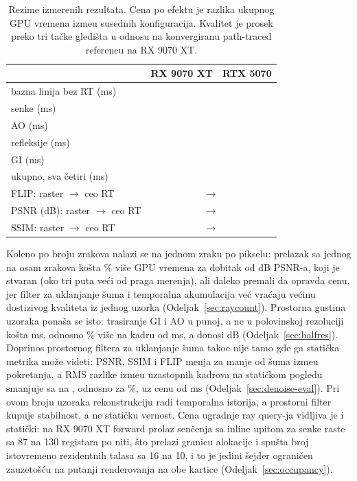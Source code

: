 \begin{table}[tbp]
\caption[Rezime izmerenih rezultata]{Rezime izmerenih rezultata. Cena po efektu je razlika ukupnog
GPU vremena izme\dj u susednih konfiguracija. Kvalitet je prosek preko tri ta\v{c}ke gledi\v{s}ta u
odnosu na konvergiranu path-traced referencu na RX 9070 XT.}
\label{tab:summary}
\centering
\begin{tabular}{lrr}
\toprule
 & RX 9070 XT & RTX 5070 \\
\midrule
bazna linija bez RT (ms)  & \perfBaseAMD{}        & \perfBaseNV{} \\
senke (ms)                & \perfEffShadowsAMD{}  & \perfEffShadowsNV{} \\
AO (ms)                   & \perfEffAoAMD{}       & \perfEffAoNV{} \\
refleksije (ms)           & \perfEffReflAMD{}     & \perfEffReflNV{} \\
GI (ms)                   & \perfEffGiAMD{}       & \perfEffGiNV{} \\
\midrule
ukupno, sva \v{c}etiri (ms) & \perfTotalAMD{}     & \perfTotalNV{} \\
\midrule
FLIP: raster $\rightarrow$ ceo RT  & \multicolumn{2}{c}{\qRasterFlip{} $\rightarrow$ \qAllRtFlip{}} \\
PSNR (dB): raster $\rightarrow$ ceo RT & \multicolumn{2}{c}{\qRasterPsnr{} $\rightarrow$ \qAllRtPsnr{}} \\
SSIM: raster $\rightarrow$ ceo RT  & \multicolumn{2}{c}{\qRasterSsim{} $\rightarrow$ \qAllRtSsim{}} \\
\bottomrule
\end{tabular}
\end{table}

Koleno po broju zrakova nalazi se na jednom zraku po pikselu: prelazak sa jednog na osam zrakova
ko\v{s}ta \rcGpuPct\% vi\v{s}e GPU vremena za dobitak od \rcPsnrGain{} dB PSNR-a, koji je stvaran
(oko tri puta ve\'ci od praga merenja), ali daleko premali da opravda cenu, jer filter za uklanjanje
\v{s}uma i temporalna akumulacija ve\'c vra\'caju ve\'cinu dostizivog kvaliteta iz jednog uzorka
(Odeljak~\ref{sec:raycount}). Prostorna gustina uzoraka pona\v{s}a se isto: trasiranje GI i AO u punoj,
a ne u polovinskoj rezoluciji ko\v{s}ta \hrDeltaMs{} ms, odnosno \hrDeltaPct\% vi\v{s}e na kadru od
\hrHalfTotal{} ms, a donosi \hrPsnrGain{} dB (Odeljak~\ref{sec:halfres}). Doprinos prostornog filtera
za uklanjanje \v{s}uma tako\dj e nije tamo gde ga stati\v{c}ka metrika mo\v{z}e videti: PSNR, SSIM i FLIP
menja za manje od \v{s}uma izme\dj u pokretanja, a RMS razlike izme\dj u uzastopnih kadrova na
stati\v{c}kom pogledu smanjuje sa \flickerOff{} na \flickerOn{}, odnosno za \flickerPct\%, uz cenu od
\perfDenoiseAMD{} ms (Odeljak~\ref{sec:denoise-eval}). Pri ovom broju uzoraka rekonstrukciju radi
temporalna istorija, a prostorni filter kupuje stabilnost, a ne stati\v{c}ku vernost. Cena
ugradnje ray query-ja vidljiva je i stati\v{c}ki: na RX 9070 XT forward prolaz sen\v{c}enja sa inline
upitom za senke raste sa 87 na 130 registara po niti, \v{s}to prelazi granicu alokacije i spu\v{s}ta broj
istovremeno rezidentnih talasa sa 16 na 10, i to je jedini \v{s}ejder ograni\v{c}en zauzeto\v{s}\'cu na
putanji renderovanja na obe kartice (Odeljak~\ref{sec:occupancy}).

